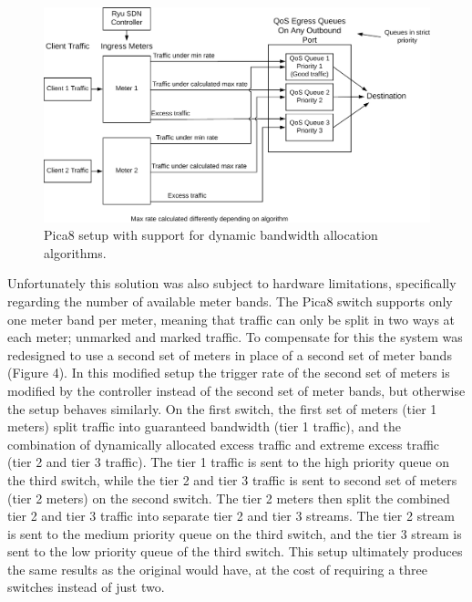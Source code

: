 \documentclass[accepted,single]{gipaper}
\begin{document}
\begin{figure}
	\centering
	\includegraphics[width=6in]{figs/dbaFramework.png}
	\caption{ Pica8 setup with support for dynamic bandwidth allocation algorithms. } \label{dbaDiag}
\end{figure}

Unfortunately this solution was also subject to hardware limitations, specifically regarding the number of available meter bands. The Pica8 switch supports only one meter band per meter, meaning that traffic can only be split in two ways at each meter; unmarked and marked traffic. To compensate for this the system was redesigned to use a second set of meters in place of a second set of meter bands (Figure 4). In this modified setup the trigger rate of the second set of meters is modified by the controller instead of the second set of meter bands, but otherwise the setup behaves similarly. On the first switch, the first set of meters (tier 1 meters) split traffic into guaranteed bandwidth (tier 1 traffic), and the combination of dynamically allocated excess traffic and extreme excess traffic (tier 2 and tier 3 traffic). The tier 1 traffic is sent to the high priority queue on the third switch, while the tier 2 and tier 3 traffic is sent to second set of meters (tier 2 meters) on the second switch. The tier 2 meters then split the combined tier 2 and tier 3 traffic into separate tier 2 and tier 3 streams. The tier 2 stream is sent to the medium priority queue on the third switch, and the tier 3 stream is sent to the low priority queue of the third switch. This setup ultimately produces the same results as the original would have, at the cost of requiring a three switches instead of just two.
\end{document}
